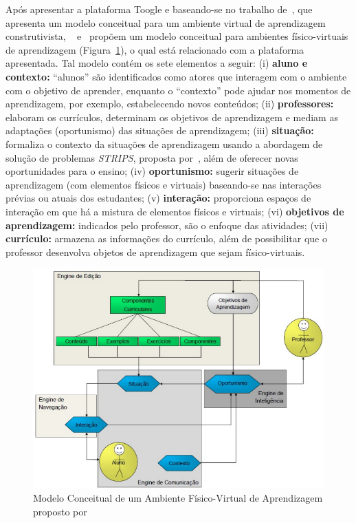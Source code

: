 Após apresentar a plataforma Toogle e baseando-se no trabalho de~\cite{xu:2005}, que apresenta um modelo conceitual para um ambiente virtual de aprendizagem construtivista, ~\cite{Santos:2014} e~\cite{santos:2014ambientes} propõem um modelo conceitual para ambientes físico-virtuais de aprendizagem (Figura~\ref{fig:santos2014modelo}), o qual está relacionado com a plataforma apresentada. Tal modelo contém os sete elementos a seguir: (i) \textbf{aluno e contexto:} ``alunos'' são identificados como atores que interagem com o ambiente com o objetivo de aprender, enquanto o ``contexto'' pode ajudar nos momentos de aprendizagem, por exemplo, estabelecendo novos conteúdos; (ii) \textbf{professores: } elaboram os currículos, determinam os objetivos de aprendizagem e mediam as adaptações (oportunismo) das situações de aprendizagem; (iii) \textbf{situação: } formaliza o contexto da situações de aprendizagem usando a abordagem de solução de problemas \textit{STRIPS}, proposta por~\cite{fikes:1971}, além de oferecer novas oportunidades para o ensino; (iv) \textbf{oportunismo: }sugerir situações de aprendizagem (com elementos físicos e virtuais) baseando-se nas interações prévias ou atuais dos estudantes; (v) \textbf{interação: }proporciona espaços de interação em que há a mistura de elementos físicos e virtuais; (vi) \textbf{objetivos de aprendizagem: } indicados pelo professor, são o enfoque das atividades; (vii) \textbf{currículo:} armazena as informações do currículo, além de possibilitar que o professor desenvolva objetos de aprendizagem que sejam físico-virtuais.

\begin{figure}[htb]
	\centering
	\includegraphics[width=0.9\linewidth]{chapters/works/santos2014_modelo_v2.png}
	\captionsetup{justification=centering}
	\caption{Modelo Conceitual de um Ambiente Físico-Virtual de Aprendizagem proposto por~\cite{santos:2014ambientes}}
	\label{fig:santos2014modelo}
\end{figure}


